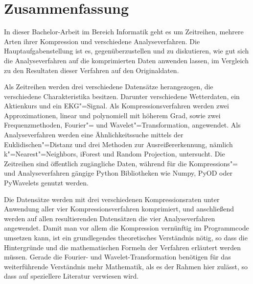 \chapter*{Zusammenfassung}
In dieser Bachelor-Arbeit im Bereich Informatik geht es um Zeitreihen, mehrere Arten ihrer Kompression und verschiedene Analyseverfahren. Die Hauptaufgabenstellung ist es,
gegenüberzustellen und zu diskutieren, wie gut sich die Analyseverfahren auf die komprimierten Daten anwenden lassen, im Vergleich zu den Resultaten dieser Verfahren auf den
Originaldaten.

Als Zeitreihen werden drei verschiedene Datensätze herangezogen, die verschiedene Charakteristika besitzen. Darunter verschiedene Wetterdaten, ein Aktienkurs und ein EKG"=Signal. Als Kompressionsverfahren werden zwei Approximationen, linear und polynomiell mit höherem Grad, sowie zwei Frequenzmethoden, Fourier"= und Wavelet"=Transformation, angewendet. Als Analyseverfahren werden eine Ähnlichkeitssuche mittels der Euklidischen"=Distanz und drei Methoden zur Ausreißererkennung, nämlich k"=Nearest"=Neighbors, iForest und Random Projection, untersucht. Die Zeitreihen sind öffentlich zugängliche Daten, während für die Kompressions"= und Analyseverfahren gängige Python Bibliotheken wie Numpy, PyOD oder PyWavelets genutzt werden.

Die Datensätze werden mit drei verschiedenen Kompressionsraten unter Anwendung aller vier Kompressionsverfahren komprimiert, und anschließend werden auf allen resultierenden Datensätzen die vier Analyseverfahren angewendet. Damit man vor allem die Kompression vernünftig im Programmcode umsetzen kann, ist ein grundlegendes theoretisches Verständnis nötig, so dass die Hintergründe und die mathematischen Formeln der Verfahren erläutert werden müssen. Gerade die Fourier- und Wavelet-Transformation benötigen für das weiterführende Verständnis mehr Mathematik, als es der Rahmen hier zulässt, so dass auf speziellere Literatur verwiesen wird.

